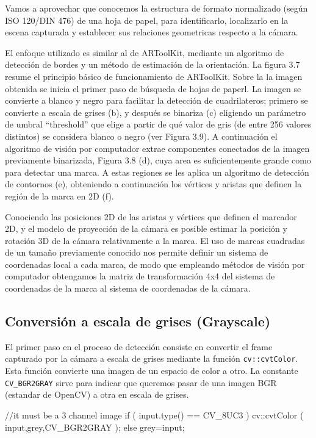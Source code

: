 Vamos a aprovechar que conocemos la estructura de formato normalizado (según ISO 120/DIN 476) de una hoja de papel, para identificarlo, localizarlo en la escena capturada y establecer sus relaciones geometricas respecto a la cámara.

El enfoque utilizado es similar al de ARToolKit, mediante un algoritmo de detección de bordes y un método  de estimación de la orientación. La figura 3.7 resume el principio básico de funcionamiento de ARToolKit. Sobre la la imagen obtenida se inicia el primer paso de búsqueda de hojas de paperl. La imagen se convierte a blanco y negro para facilitar la detección de cuadrilateros; primero se convierte a escala de grises (b), y después se binariza (c) eligiendo un parámetro de umbral “threshold” que elige a partir de qué valor de gris (de entre 256 valores distintos) se considera blanco o negro (ver Figura 3.9). A continuación el algoritmo de visión por computador extrae componentes conectados de la imagen previamente binarizada, Figura 3.8 (d), cuya area es suficientemente grande como para detectar una marca. A estas regiones se les aplica un  algoritmo de detección de contornos (e), obteniendo a continuación los vértices y aristas que definen la región de la marca en 2D (f).

Conociendo las posiciones 2D de las aristas y vértices que definen el marcador 2D, y el modelo de proyección de la cámara es posible estimar la posición y rotación 3D de la cámara relativamente a la marca. El uso de marcas cuadradas de un tamaño previamente conocido nos permite definir un sistema de coordenadas local a cada marca, de modo que empleando métodos de visión por computador obtengamos la matriz de transformación 4x4 del sistema de coordenadas de la marca al sistema de coordenadas de la cámara.

\subsection{Conversión a escala de grises (Grayscale)}
El primer paso en el proceso de detección consiste en convertir el frame capturado por la cámara a escala de grises mediante la función \texttt{cv::cvtColor}. Esta función convierte una imagen de un espacio de color a otro. La constante \texttt{CV\_BGR2GRAY} sirve para indicar que queremos pasar de una imagen BGR (estandar de OpenCV) a otra en escala de grises.

\begin{listing}[
  float=ht,
  language = C++,
  caption  = {Conversión a escala de grises (256 niveles)},
  label    = code:cvtColor()]
  //it must be a 3 channel image
  if ( input.type() == CV_8UC3 )   
     cv::cvtColor ( input,grey,CV_BGR2GRAY );
  else 
     grey=input;
\end{listing}

